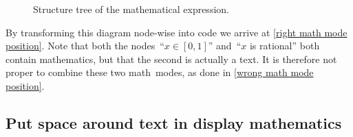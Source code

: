 \begin{figure}[tb]
  \begin{center}
  \end{center}
  \caption{Structure tree of the mathematical expression.}
  \label{structure tree of math}
\end{figure}
By transforming this diagram node-wise into code we arrive at \cref{right math mode position}.
Note that both the nodes~\enquote{$x \in [0,1]$} and~\enquote{$x$ is rational} both contain mathematics, but that the second is actually a text.
It is therefore not proper to combine these two math~modes, as done in \cref{wrong math mode position}.



\subsection{Put space around text in display mathematics}

